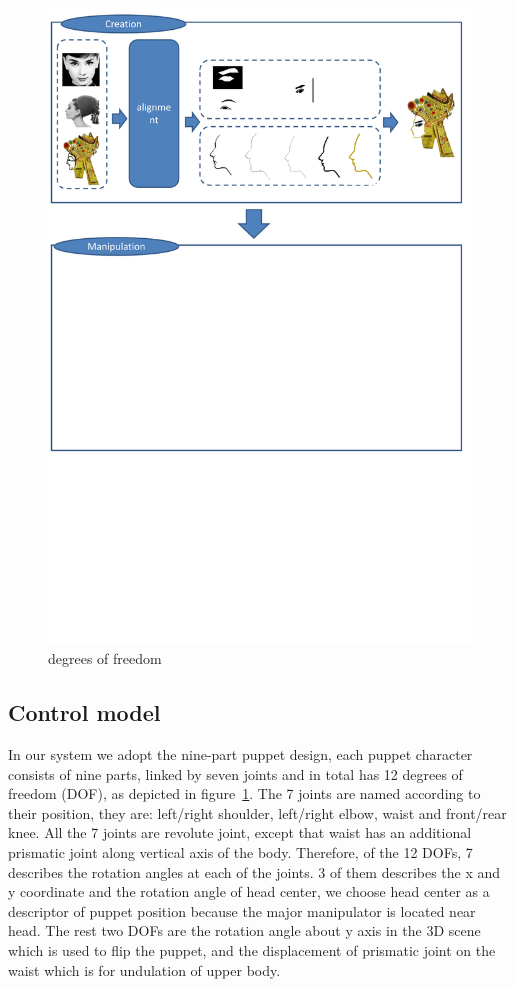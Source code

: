 \documentclass[letter]{sig-alternate}
\begin{document}
\begin{figure}[t]
\begin{center}
\includegraphics[scale=0.35]{figure/framework.pdf}
\caption{\small{degrees of freedom}}
\label{fig:degreeoffreedom}
\end{center}
\end{figure}

\subsection{Control model}
In our system we adopt the nine-part puppet design, each puppet character consists of nine parts, linked by seven joints and in total has 12 degrees of freedom (DOF), as depicted in figure~\ref{fig:degreeoffreedom}. The 7 joints are named according to their position, they are: left/right shoulder, left/right elbow, waist and front/rear knee. All the 7 joints are revolute joint, except that waist has an additional prismatic joint along vertical axis of the body. 
Therefore, of the 12 DOFs, 7 describes the rotation angles at each of the joints. 3 of them describes the x and y coordinate and the rotation angle of head center, we choose head center as a descriptor of puppet position because the major manipulator is located near head. The rest two DOFs are the rotation angle about y axis in the 3D scene which is used to flip the puppet, and the displacement of prismatic joint on the waist which is for undulation of upper body.
\end{document}
